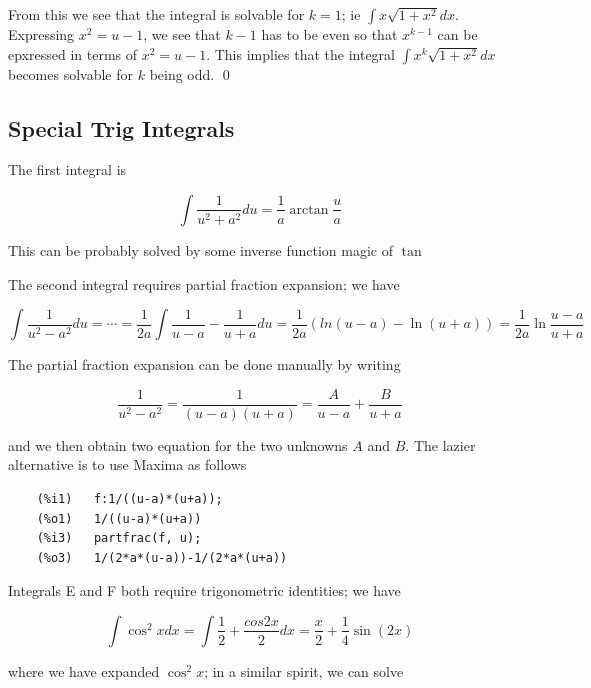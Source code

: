 From this we see that the integral is solvable for $k=1$; ie $\int x \sqrt{1+x^2} dx$. Expressing $x^2 = u-1$, we see that $k-1$ has to be even so that $x^{k-1}$ can be epxressed in terms of $x^2 = u-1$. This implies that the integral $\int x^k \sqrt{1+x^2} dx$ becomes solvable for $k$ being odd. \qed


\subsection{Special Trig Integrals}

The first integral is

\begin{equation*}
    \int \frac{1}{u^2 + a^2} du = \frac{1}{a} \arctan \frac{u}{a}
\end{equation*}

This can be probably solved by some inverse function magic of $\tan$ 


The second integral requires partial fraction expansion; we have

\begin{equation*}
    \int \frac{1}{u^2 - a^2} du = \cdots = \frac{1}{2a} \int \frac{1}{u-a} - \frac{1}{u+a} du = \frac{1}{2a} \left( ln(u-a) - \ln(u+a) \right) = \frac{1}{2a} \ln \frac{u-a}{u+a}
\end{equation*}

The partial fraction expansion can be done manually by writing

\begin{equation*}
    \frac{1}{u^2 - a^2} = \frac{1}{(u-a)(u+a)} = \frac{A}{u-a} + \frac{B}{u+a}
\end{equation*}

and we then obtain two equation for the two unknowns $A$ and $B$. The lazier alternative is to use Maxima as follows

\begin{verbatim}
    (%i1)	f:1/((u-a)*(u+a));
    (%o1)	1/((u-a)*(u+a))
    (%i3)	partfrac(f, u);
    (%o3)	1/(2*a*(u-a))-1/(2*a*(u+a))
\end{verbatim}

Integrals E and F both require trigonometric identities; we have

\begin{equation*}
    \int \cos^2 x dx = \int \frac{1}{2} + \frac{cos 2x}{2} dx = \frac{x}{2} + \frac{1}{4} \sin(2x)
\end{equation*}

where we have expanded $\cos^2 x$; in a similar spirit, we can solve

